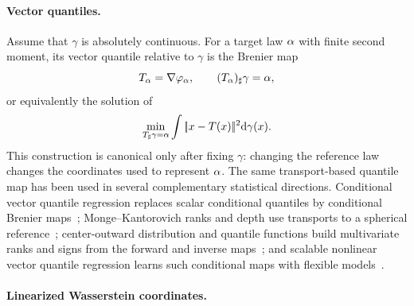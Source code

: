 \paragraph{Vector quantiles.}

Assume that $\gamma$ is absolutely continuous. For a target law $\alpha$ with finite second moment, its vector quantile relative to $\gamma$ is the Brenier map
\[
	T_\alpha=\nabla\varphi_\alpha,
	\qquad
	(T_\alpha)_\sharp\gamma=\alpha,
\]
or equivalently the solution of
\[
	\min_{T_\sharp\gamma=\alpha}
	\int |\!| x-T(x) |\!|^2\mathrm{d}\gamma(x).
\]
This construction is canonical only after fixing $\gamma$: changing the reference law changes the coordinates used to represent $\alpha$. The same transport-based quantile map has been used in several complementary statistical directions. Conditional vector quantile regression replaces scalar conditional quantiles by conditional Brenier maps~\cite{carlier2016vectorquantile,carlier2016vector}; Monge--Kantorovich ranks and depth use transports to a spherical reference~\cite{chernozhukov2017monge}; center-outward distribution and quantile functions build multivariate ranks and signs from the forward and inverse maps~\cite{hallin2021distribution}; and scalable nonlinear vector quantile regression learns such conditional maps with flexible models~\cite{rosenberg2023fast}.

\paragraph{Linearized Wasserstein coordinates.}

